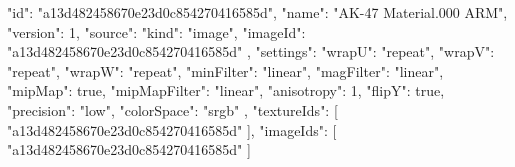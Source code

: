 {
  "id": "a13d482458670e23d0c854270416585d",
  "name": "AK-47 Material.000 ARM",
  "version": 1,
  "source": {
    "kind": "image",
    "imageId": "a13d482458670e23d0c854270416585d"
  },
  "settings": {
    "wrapU": "repeat",
    "wrapV": "repeat",
    "wrapW": "repeat",
    "minFilter": "linear",
    "magFilter": "linear",
    "mipMap": true,
    "mipMapFilter": "linear",
    "anisotropy": 1,
    "flipY": true,
    "precision": "low",
    "colorSpace": "srgb"
  },
  "textureIds": [
    "a13d482458670e23d0c854270416585d"
  ],
  "imageIds": [
    "a13d482458670e23d0c854270416585d"
  ]
}
